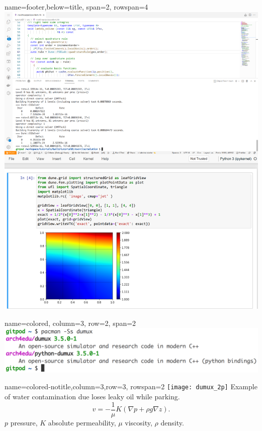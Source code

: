\documentclass[
	paper=a0,
	style=ruled, %
	]{bfhsciposter}
\begin{document}
\begin{tcbposter}[
		poster={
				columns=4,
				rows=7,
				spacing=1cm,
			},]
	\begin{posterboxenv}[BFH-framed,title=Tutorials available on Gitpod
			\\
			\url{https://cpp-review-dune.github.io/tutorial}]{name=footer,below=title, span=2, rowspan=4}
		\includegraphics[width=\linewidth]{gitpod_dune}
	\end{posterboxenv}

	\begin{posterboxenv}[title=C++ Review DUNE meets Arch Linux Repository for Education, BFH-framed]{name=colored, column=3, row=2, span=2}
		\includegraphics[width=\linewidth]{arch4edu_gitpod}
	\end{posterboxenv}

	\begin{posterboxenv}{name=colored-notitle,column=3,row=3, rowspan=2}
		\texttt{[image: dumux\_2p]}
		Example of water contamination due loses leaky oil while parking.
		\[
			\boxed{
				v=
				-\frac{1}{\mu}
				K
				\left(\nabla p+\rho g \nabla z\right).
			}
		\]
		$p$ pressure, $K$ absolute permeability,
		$\mu$ viscosity, $\rho$ density.
	\end{posterboxenv}


\end{tcbposter}
\end{document}
